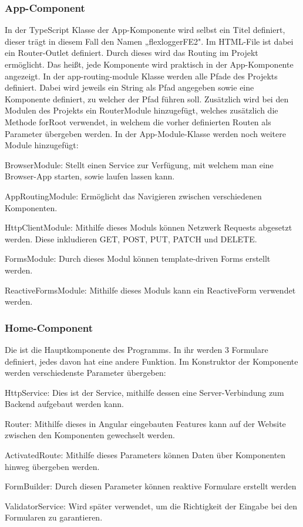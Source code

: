 \subsubsection{App-Component}
In der TypeScript Klasse der App-Komponente wird selbst ein Titel definiert, dieser trägt in diesem Fall den Namen „flexloggerFE2". Im HTML-File ist dabei ein Router-Outlet definiert. Durch dieses wird das Routing im Projekt ermöglicht. Das heißt, jede Komponente wird praktisch in der App-Komponente angezeigt. In der app-routing-module Klasse werden alle Pfade des Projekts definiert. Dabei wird jeweils ein String als Pfad angegeben sowie eine Komponente definiert, zu welcher der Pfad führen soll. Zusätzlich wird bei den Modulen des Projekts ein RouterModule hinzugefügt, welches zusätzlich die Methode forRoot verwendet, in welchem die vorher definierten Routen als Parameter übergeben werden. In der App-Module-Klasse werden noch weitere Module hinzugefügt:
 
\begin{compactitem}
    \item BrowserModule: Stellt einen Service zur Verfügung, mit welchem man eine Browser-App starten, sowie laufen lassen kann.   
    \item AppRoutingModule: Ermöglicht das Navigieren zwischen verschiedenen Komponenten.    
    \item HttpClientModule: Mithilfe dieses Moduls können Netzwerk Requests abgesetzt werden. Diese inkludieren GET, POST, PUT, PATCH und DELETE.   
    \item FormsModule: Durch dieses Modul können template-driven Forms erstellt werden.   
    \item ReactiveFormsModule: Mithilfe dieses Moduls kann ein ReactiveForm verwendet werden.
\end{compactitem}
 
\subsubsection{Home-Component}
Die ist die Hauptkomponente des Programms. In ihr werden 3 Formulare definiert, jedes davon hat eine andere Funktion. Im Konstruktor der Komponente werden verschiedenste Parameter übergeben:
 
\begin{compactitem}
    \item HttpService: Dies ist der Service, mithilfe dessen eine Server-Verbindung zum Backend aufgebaut werden kann.   
    \item Router: Mithilfe dieses in Angular eingebauten Features kann auf der Website zwischen den Komponenten gewechselt werden.       
    \item ActivatedRoute: Mithilfe dieses Parameters können Daten über Komponenten hinweg übergeben werden.   
    \item FormBuilder: Durch diesen Parameter können reaktive Formulare erstellt werden
    \item ValidatorService: Wird später verwendet, um die Richtigkeit der Eingabe bei den Formularen zu garantieren.
\end{compactitem}
 

